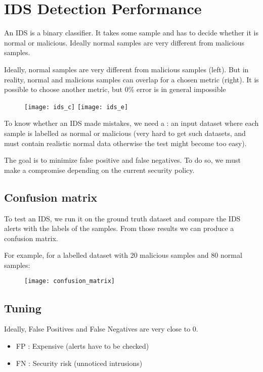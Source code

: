 \chapter{IDS Detection Performance}

An IDS is a binary classifier. It takes some sample and has to decide whether it is normal or malicious. Ideally normal samples are very different from malicious samples.

Ideally, normal samples are very different from malicious samples (left). But in reality, normal and malicious samples can overlap for a chosen metric (right). It is possible to choose another metric, but $0$\% error is in general impossible

\begin{figure}[H]
    \centering
    \texttt{[image: ids\_c]}\hfill
    \texttt{[image: ids\_e]}
\end{figure}

To know whether an IDS made mistakes, we need a  : an input dataset where each sample is labelled as normal or malicious (very hard to get such datasets, and must contain realistic normal data otherwise the test might become too easy).

The goal is to minimize false positive and false negatives. To do so, we must make a compromise depending on the current security policy.

\section{Confusion matrix}

To test an IDS, we run it on the ground truth dataset and compare the IDS alerts with the labels of the samples. From those results we can produce a confusion matrix.

For example, for a labelled dataset with 20 malicious samples and 80 normal samples:

\begin{figure}[H]
    \centering
    \texttt{[image: confusion\_matrix]}
\end{figure}

\section{Tuning}

Ideally, False Positives and False Negatives are very close to 0.
\begin{itemize}
    \item FP : Expensive (alerts have to be checked)
    \item FN : Security risk (unnoticed intrusions)
\end{itemize}

